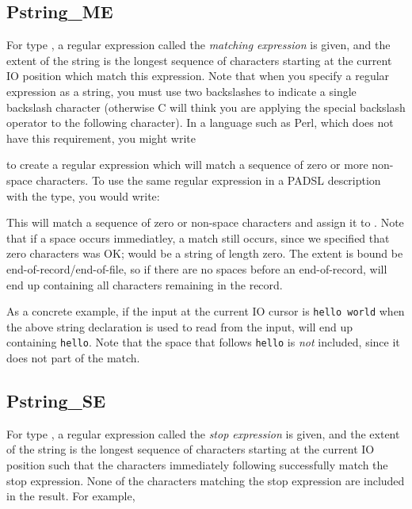 \subsection{Pstring\_ME}

\aedBegin{}
\aedEnd{}

For type , a regular expression called the {\em matching
expression\/} is given, and the extent of the string is the longest
sequence of characters starting at the current IO position which match
this expression.  Note that when you specify a regular expression as
a \C{} string, you must use two backslashes to indicate a single
backslash character (otherwise C will think you are applying the
special backslash operator to the following character). 
In a language such as Perl, which does not have this requirement,
you might write

%
\noindent
to create a regular expression which will match a
sequence of zero or more non-space characters.  To use the
same regular expression in a PADSL description
with the  type, you would write:

%
\noindent
This will match a sequence of zero or non-space characters and assign
it to .  Note that if a space occurs immediatley, a match
still occurs, since we specified that zero characters was OK;
 would be a string of length zero.  The extent is bound be
end-of-record/end-of-file, so if there are no spaces before an
end-of-record,  will end up containing all characters
remaining in the record.

As a concrete example, if the input at the current IO cursor is {\tt hello
world} when the above string declaration is used to read from the
input,  will end up containing {\tt hello}.  Note that the
space that follows {\tt hello} is {\em not} included, since it does not
part of the match.

\subsection{Pstring\_SE}

\aedBegin{}
\aedEnd{}

For type , a regular expression called the {\em stop
expression\/} is given, and the extent of the string is the longest
sequence of characters starting at the current IO position such that
the characters immediately following successfully match the stop
expression.  None of the characters matching the stop expression
are included in the result.
For example,

